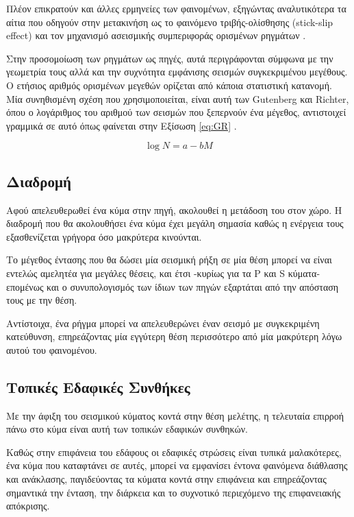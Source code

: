 Πλέον επικρατούν και άλλες ερμηνείες των φαινομένων, εξηγώντας αναλυτικότερα τα αίτια που οδηγούν στην μετακινήση ως το φαινόμενο τριβής-ολίσθησης (stick-slip effect) \parencite{Brace} και τον μηχανισμό ασεισμικής συμπεριφοράς ορισμένων ρηγμάτων \parencite{Wang}.


Στην προσομοίωση των ρηγμάτων ως πηγές, αυτά περιγράφονται σύμφωνα με την γεωμετρία τους αλλά και την συχνότητα εμφάνισης σεισμών συγκεκριμένου μεγέθους. Ο ετήσιος αριθμός ορισμένων μεγεθών ορίζεται από κάποια στατιστική κατανομή. Μία συνηθισμένη σχέση που χρησιμοποιείται, είναι αυτή των Gutenberg και Richter, όπου ο λογάριθμος του αριθμού των σεισμών που ξεπερνούν ένα μέγεθος, αντιστοιχεί γραμμικά σε αυτό όπως φαίνεται στην Εξίσωση \ref{eq:GR} \parencite{GR}.

\begin{equation}
	\log{N} = a - b M
	\label{eq:GR}
\end{equation}

\subsection{Διαδρομή}
Αφού απελευθερωθεί ένα κύμα στην πηγή, ακολουθεί η μετάδοση του στον χώρο. Η διαδρομή που θα ακολουθήσει ένα κύμα έχει μεγάλη σημασία καθώς η ενέργεια τους εξασθενίζεται γρήγορα όσο μακρύτερα κινούνται.

Το μέγεθος έντασης που θα δώσει μία σεισμική ρήξη σε μία θέση μπορεί να είναι εντελώς αμελητέα για μεγάλες θέσεις, και έτσι -κυρίως για τα P και S κύματα- επομένως και ο συνυπολογισμός των ίδιων των πηγών εξαρτάται από την απόσταση τους με την θέση.

Αντίστοιχα, ένα ρήγμα μπορεί να απελευθερώνει έναν σεισμό με συγκεκριμένη κατεύθυνση, επηρεάζοντας μία εγγύτερη θέση περισσότερο από μία μακρύτερη λόγω αυτού του φαινομένου.


\subsection{Τοπικές Εδαφικές Συνθήκες}
Με την άφιξη του σεισμικού κύματος κοντά στην θέση μελέτης, η τελευταία επιρροή πάνω στο κύμα είναι αυτή των τοπικών εδαφικών συνθηκών.

Καθώς στην επιφάνεια του εδάφους οι εδαφικές στρώσεις είναι τυπικά μαλακότερες, ένα κύμα που καταφτάνει σε αυτές, μπορεί να εμφανίσει έντονα φαινόμενα διάθλασης και ανάκλασης, παγιδεύοντας τα κύματα κοντά στην επιφάνεια και επηρεάζοντας σημαντικά την ένταση, την διάρκεια και το συχνοτικό περιεχόμενο της επιφανειακής απόκρισης.

